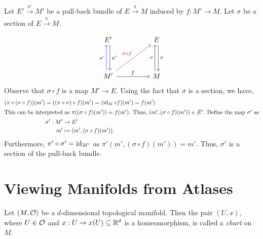 \begin{remark}
	Let \(E' \xrightarrow[]{\ \pi'\ } M'\) be a pull-back bundle of \(E \xrightarrow[]{\ \pi\ } M\) induced by \(f: M' \to M\). Let \(\sigma\) be a section of \(E \xrightarrow[]{\ \pi\ } M\).
	\begin{equation}
		\begin{tikzcd}
			E' \arrow[dd, shift left, "\pi'"] & & E \arrow[dd, shift left, "\pi"] \\
			& & \\
			M' \arrow[uu, blue, shift left, "\sigma'"] \arrow[rr, "f"] \arrow[rruu, purple, "\sigma \circ f"] & & M \arrow[uu, shift left, "\sigma"]
		\end{tikzcd}
	\end{equation}
	Observe that \(\sigma \circ f\) is a map \(M' \to E\). Using the fact that \(\sigma\) is a section, we have,
	\begin{gather}
		(\pi \circ (\sigma \circ f))(m') = ((\pi \circ \sigma) \circ f)(m') = (\operatorname{id}_{M} \circ f)(m') = f(m') \nonumber \\
		\intertext{This can be interpreted as \(\pi((\sigma \circ f)(m')) = f(m')\). Thus, \((m', (\sigma \circ f)(m')) \in E'\). Define the map \(\sigma'\) as}
		\begin{aligned}
			\sigma': M' & \to E'                              \\
			m'          & \mapsto (m', (\sigma \circ f)(m')).
		\end{aligned}
	\end{gather}
	Furthermore, \(\pi' \circ \sigma' = \operatorname{id}_{M'}\) as \(\pi'(m', (\sigma \circ f)(m')) = m'\). Thus, \(\sigma'\) is a section of the pull-back bundle.
\end{remark}

\section{Viewing Manifolds from Atlases}

\begin{definition}[Chart]\label{def:chart}
	Let \((M, \mathcal{O})\) be a \(d\)-dimensional topological manifold. Then the pair \((U, x)\), where \(U \in \mathcal{O}\) and \(x: U \to x(U) \subseteq \mathbb R^d\) is a homeomorphism, is called a \emph{chart} on \(M\).
\end{definition}
